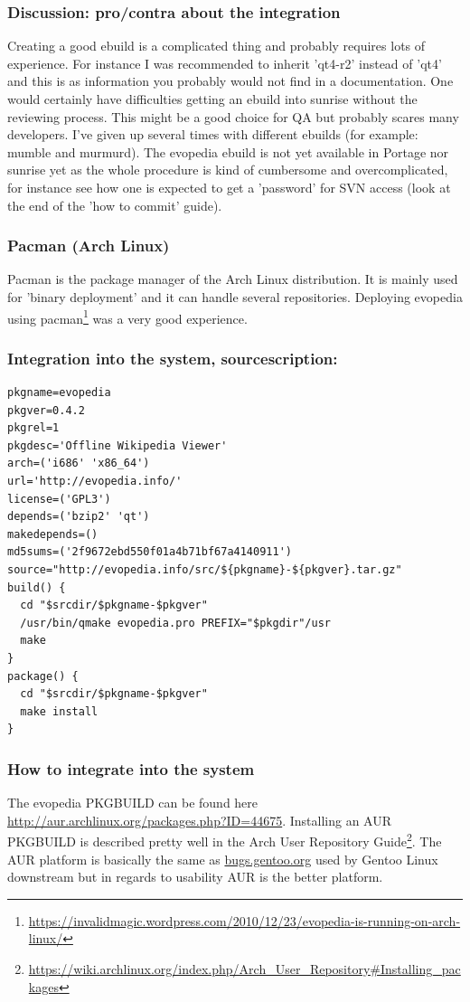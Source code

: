 \documentclass[a4paper,10pt]{article}
\begin{document}
\subsubsection*{Discussion: pro/contra about the integration}
Creating a good ebuild is a complicated thing and probably requires lots of experience. For instance I was recommended to inherit 'qt4-r2' instead of 'qt4' and this is as information you probably would not find in a documentation. One would certainly have difficulties getting an ebuild into sunrise without the reviewing process. This might be a good choice for QA but probably scares many developers. I've given up several times with different ebuilds (for example: mumble and murmurd). The evopedia ebuild is not yet available in Portage nor sunrise yet as the whole procedure is kind of cumbersome and overcomplicated, for instance see how one is expected to get a 'password' for SVN access (look at the end of the 'how to commit' guide). 





\newpage
\subsubsection{Pacman (Arch Linux)}
Pacman is the package manager of the Arch Linux distribution. It is mainly used for 'binary deployment' and it can handle several repositories. Deploying evopedia using pacman\footnote{\url{https://invalidmagic.wordpress.com/2010/12/23/evopedia-is-running-on-arch-linux/}} was a very good experience.

\subsubsection*{Integration into the system, sourcescription:}

\begin{verbatim}
pkgname=evopedia
pkgver=0.4.2
pkgrel=1
pkgdesc='Offline Wikipedia Viewer'
arch=('i686' 'x86_64')
url='http://evopedia.info/'
license=('GPL3')
depends=('bzip2' 'qt')
makedepends=()
md5sums=('2f9672ebd550f01a4b71bf67a4140911')
source="http://evopedia.info/src/${pkgname}-${pkgver}.tar.gz"
build() {
  cd "$srcdir/$pkgname-$pkgver"
  /usr/bin/qmake evopedia.pro PREFIX="$pkgdir"/usr
  make
}
package() {
  cd "$srcdir/$pkgname-$pkgver"
  make install
}
\end{verbatim}

\subsubsection*{How to integrate into the system}
The evopedia PKGBUILD can be found here \url{http://aur.archlinux.org/packages.php?ID=44675}. Installing an AUR PKGBUILD is described pretty well in the Arch User Repository Guide\footnote{\url{https://wiki.archlinux.org/index.php/Arch_User_Repository\#Installing_packages}}. The AUR platform is basically the same as \url{bugs.gentoo.org} used by Gentoo Linux downstream but in regards to usability AUR is the better platform.
\end{document}
